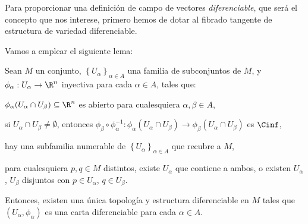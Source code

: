 Para proporcionar una definición de campo de vectores \emph{diferenciable}, que
será el concepto que nos interese, primero hemos de dotar al fibrado tangente de
estructura de variedad diferenciable.

Vamos a emplear el siguiente lema:
\begin{lema} \label{lema:est-dif}
  Sean $M$ un conjunto, $\left\{ U_{\alpha} \right\}_{\alpha\in A}$ una familia
  de subconjuntos de $M$, y $\phi_{\alpha}: U_{\alpha}\to \R^{n}$ inyectiva para
  cada $\alpha\in A$, tales que:
  \begin{nlist}
  \item \label{item:abierto}
    $\phi_{\alpha}(U_{\alpha}\cap U_{\beta})\subseteq \R^{n}$ es abierto para
    cualesquiera $\alpha,\beta\in A$,
  \item \label{item:diff}
    si $U_{\alpha}\cap U_{\beta}\ne \emptyset$, entonces
    $\phi_{\beta}\circ\phi_{\alpha}^{-1}: \phi_{\alpha}(U_{\alpha}\cap
    U_{\beta})\to \phi_{\beta}(U_{\alpha}\cap U_{\beta})$ es $\Cinf$,
  \item \label{item:recubre}
    hay una subfamilia numerable de $\left\{ U_{\alpha} \right\}_{\alpha\in A}$ que
    recubre a $M$,
  \item
    para cualesquiera $p,q\in M$ distintos, existe $U_{\alpha}$ que contiene a
    ambos, o existen $U_{\alpha}$, $U_{\beta}$ disjuntos con $p\in U_{\alpha}$,
    $q\in U_{\beta}$.
  \end{nlist}
  Entonces, existen una única topología y estructura diferenciable en $M$ tales
  que $(U_{\alpha},\phi_{\alpha})$ es una carta diferenciable para cada $\alpha\in A$.
\end{lema}
